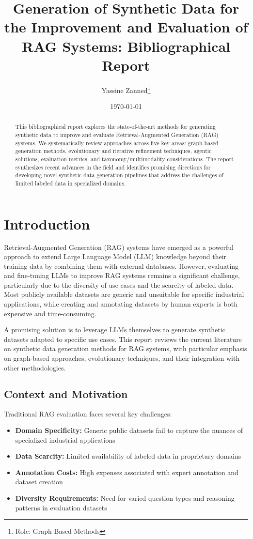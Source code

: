 \documentclass[11pt,a4paper]{article}
\title{Generation of Synthetic Data for the Improvement and Evaluation of RAG Systems: Bibliographical Report}
\author{
Yassine Zanned\thanks{Role: Graph-Based Methods} \\
}
\date{\today}
\begin{document}
\maketitle

\begin{abstract}
This bibliographical report explores the state-of-the-art methods for generating synthetic data to improve and evaluate Retrieval-Augmented Generation (RAG) systems. We systematically review approaches across five key areas: graph-based generation methods, evolutionary and iterative refinement techniques, agentic solutions, evaluation metrics, and taxonomy/multimodality considerations. The report synthesizes recent advances in the field and identifies promising directions for developing novel synthetic data generation pipelines that address the challenges of limited labeled data in specialized domains.
\end{abstract}

\tableofcontents
\newpage

\section{Introduction}

Retrieval-Augmented Generation (RAG) systems have emerged as a powerful approach to extend Large Language Model (LLM) knowledge beyond their training data by combining them with external databases. However, evaluating and fine-tuning LLMs to improve RAG systems remains a significant challenge, particularly due to the diversity of use cases and the scarcity of labeled data. Most publicly available datasets are generic and unsuitable for specific industrial applications, while creating and annotating datasets by human experts is both expensive and time-consuming.

A promising solution is to leverage LLMs themselves to generate synthetic datasets adapted to specific use cases. This report reviews the current literature on synthetic data generation methods for RAG systems, with particular emphasis on graph-based approaches, evolutionary techniques, and their integration with other methodologies.

\subsection{Context and Motivation}

Traditional RAG evaluation faces several key challenges:
\begin{itemize}
    \item \textbf{Domain Specificity:} Generic public datasets fail to capture the nuances of specialized industrial applications
    \item \textbf{Data Scarcity:} Limited availability of labeled data in proprietary domains
    \item \textbf{Annotation Costs:} High expenses associated with expert annotation and dataset creation
    \item \textbf{Diversity Requirements:} Need for varied question types and reasoning patterns in evaluation datasets
\end{itemize}
\end{document}
